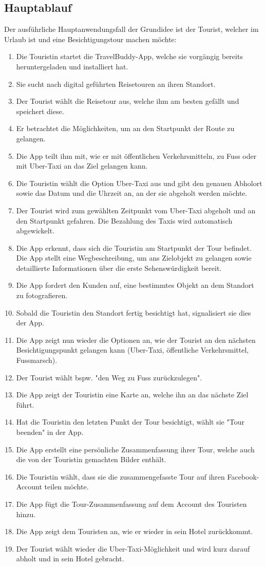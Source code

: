 \subsection{Hauptablauf}\label{Hauptablauf}
Der ausführliche Hauptanwendungsfall der Grundidee ist der Tourist, welcher im Urlaub ist und eine Besichtigungstour machen möchte:
\begin{enumerate}
\item Die Touristin startet die TravelBuddy-App, welche sie vorgängig bereits heruntergeladen und installiert hat.
\item Sie sucht nach digital geführten Reisetouren an ihren Standort.
\item Der Tourist wählt die Reisetour aus, welche ihm am besten gefällt und speichert diese.
\item Er betrachtet die Möglichkeiten, um an den Startpunkt der Route zu gelangen.
\item Die App teilt ihm mit, wie er mit öffentlichen Verkehrsmitteln, zu Fuss oder mit Uber-Taxi an das Ziel gelangen kann.
\item Die Touristin wählt die Option Uber-Taxi aus und gibt den genauen Abholort sowie das Datum und die Uhrzeit an, an der sie abgeholt werden möchte.
\item Der Tourist wird zum gewählten Zeitpunkt vom Uber-Taxi abgeholt und an den Startpunkt gefahren. Die Bezahlung des Taxis wird automatisch abgewickelt.
\item Die App erkennt, dass sich die Touristin am Startpunkt der Tour befindet. Die App stellt eine Wegbeschreibung, um ans Zielobjekt zu gelangen sowie detaillierte Informationen über die erste Sehenswürdigkeit bereit.
\item Die App fordert den Kunden auf, eine bestimmtes Objekt an dem Standort zu fotografieren.
\item Sobald die Touristin den Standort fertig besichtigt hat, signalisiert sie dies der App.
\item Die App zeigt nun wieder die Optionen an, wie der Tourist an den nächsten Besichtigungspunkt gelangen kann (Uber-Taxi, öffentliche Verkehrsmittel, Fussmarsch).
\item Der Tourist wählt bspw. "den Weg zu Fuss zurückzulegen".
\item Die App zeigt der Touristin eine Karte an, welche ihn an das nächste Ziel führt.
\item Hat die Touristin den letzten Punkt der Tour besichtigt, wählt sie "Tour beenden" in der App.
\item Die App erstellt eine persönliche Zusammenfassung ihrer Tour, welche auch die von der Touristin gemachten Bilder enthält.
\item Die Touristin wählt, dass sie die zusammengefasste Tour auf ihren Facebook-Account teilen möchte.
\item Die App fügt die Tour-Zusammenfassung auf dem Account des Touristen hinzu.
\item Die App zeigt dem Touristen an, wie er wieder in sein Hotel zurückkommt.
\item Der Tourist wählt wieder die Uber-Taxi-Möglichkeit und wird kurz darauf abholt und in sein Hotel gebracht.
\end{enumerate}

